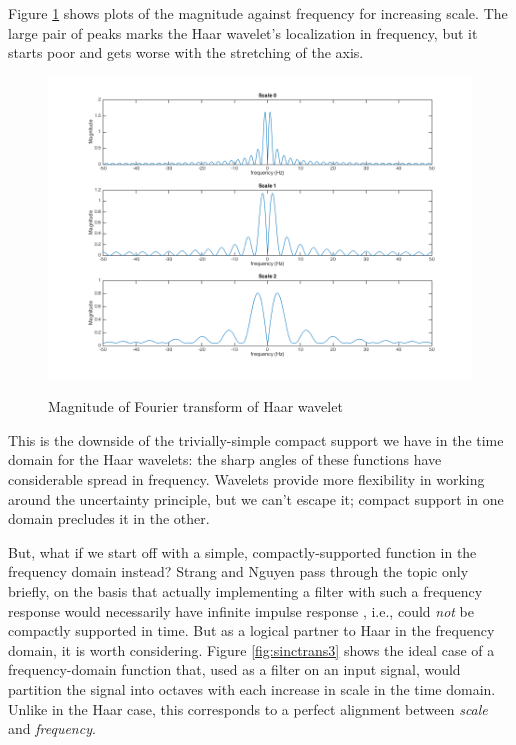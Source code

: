 \documentclass[letterpaper]{article}
\begin{document}
Figure \ref{fig:haartrans3} shows plots of the magnitude against frequency for increasing scale.
The large pair of peaks marks the Haar wavelet's localization in frequency,
but it starts poor and gets worse with the stretching of the axis.
\begin{figure}[h]
  \caption{Magnitude of Fourier transform of Haar wavelet}
  \centering
    \includegraphics[width=1\textwidth]{figures/haartrans3}
  \label{fig:haartrans3}
\end{figure}
This is the downside of the trivially-simple compact support we have in the time domain for the Haar wavelets:
the sharp angles of these functions have considerable spread in frequency.
Wavelets provide more flexibility in working around the uncertainty principle,
but we can't escape it;
compact support in one domain precludes it in the other.

But, what if we start off with a simple, compactly-supported function in the frequency domain instead?
Strang and Nguyen pass through the topic only briefly, on the basis that actually implementing a filter with such a frequency response
would necessarily have infinite impulse response \cite[p.~51]{strang}, i.e., could \emph{not} be compactly supported in time.
But as a logical partner to Haar in the frequency domain, it is worth considering.
Figure \ref{fig:sinctrans3} shows the ideal case of a frequency-domain function that,
used as a filter on an input signal, would partition the signal into octaves with each increase in scale in the time domain.
Unlike in the Haar case, this corresponds to a perfect alignment between \emph{scale} and \emph{frequency}.
\end{document}
